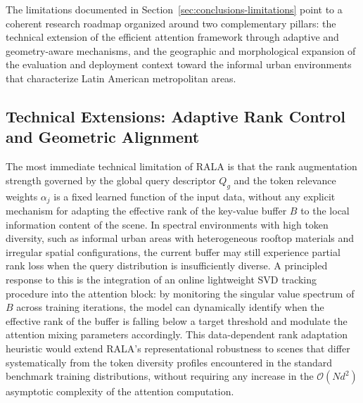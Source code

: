The limitations documented in Section~\ref{sec:conclusions-limitations} point to a coherent research roadmap organized around two complementary pillars: the technical extension of the efficient attention framework through adaptive and geometry-aware mechanisms, and the geographic and morphological expansion of the evaluation and deployment context toward the informal urban environments that characterize Latin American metropolitan areas.

\subsection*{Technical Extensions: Adaptive Rank Control and Geometric Alignment}

The most immediate technical limitation of \ac{RALA} is that the rank augmentation strength governed by the global query descriptor $Q_g$ and the token relevance weights $\alpha_j$ is a fixed learned function of the input data, without any explicit mechanism for adapting the effective rank of the key-value buffer $B$ to the local information content of the scene. In spectral environments with high token diversity, such as informal urban areas with heterogeneous rooftop materials and irregular spatial configurations, the current buffer may still experience partial rank loss when the query distribution is insufficiently diverse. A principled response to this is the integration of an online lightweight \ac{SVD} tracking procedure into the attention block: by monitoring the singular value spectrum of $B$ across training iterations, the model can dynamically identify when the effective rank of the buffer is falling below a target threshold and modulate the attention mixing parameters accordingly. This data-dependent rank adaptation heuristic would extend \ac{RALA}'s representational robustness to scenes that differ systematically from the token diversity profiles encountered in the standard benchmark training distributions, without requiring any increase in the $\mathcal{O}(N d^2)$ asymptotic complexity of the attention computation.

